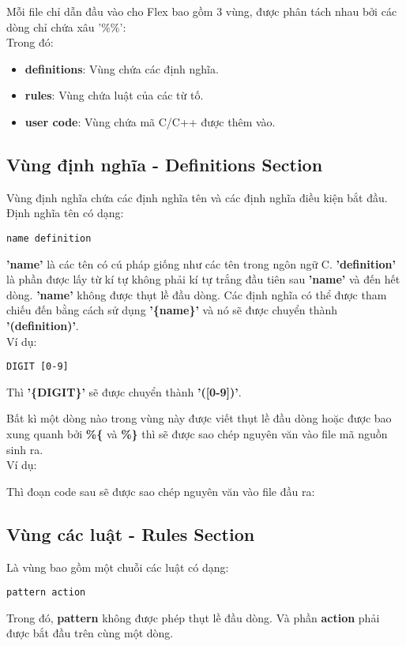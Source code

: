 \documentclass[../report.tex]{subfiles}
\begin{document}
Mỗi file chỉ dẫn đầu vào cho Flex bao gồm 3 vùng, được phân tách nhau 
bởi các dòng chỉ chứa xâu '\%\%': \cite{flex-manual} \\


\noindent Trong đó: 
\begin{itemize}
\item \textbf{definitions}: Vùng chứa các định nghĩa. 
\item \textbf{rules}: Vùng chứa luật của các từ tố. 
\item \textbf{user code}: Vùng chứa mã C/C++ được thêm vào.
\end{itemize}

\subsection{Vùng định nghĩa - Definitions Section}
Vùng định nghĩa chứa các định nghĩa tên và các định nghĩa điều kiện bắt đầu.
Định nghĩa tên có dạng:
\begin{lstlisting}
name definition
\end{lstlisting}
\textbf{'name'} là các tên có cú pháp giống như các tên trong ngôn ngữ C.
\textbf{'definition'} là phần được lấy từ kí tự không phải kí tự trắng đầu tiên 
sau \textbf{'name'} và đến hết dòng. 
\textbf{'name'} không được thụt lề đầu dòng. 
Các định nghĩa có thể được tham chiếu đến bằng cách sử dụng \textbf{'\{name\}'} 
và nó sẽ được chuyển thành \textbf{'(definition)'}. \\
Ví dụ: 
\begin{lstlisting}
DIGIT [0-9]
\end{lstlisting}
Thì \textbf{'\{DIGIT\}'} sẽ được chuyển thành \textbf{'([0-9])'}.

Bất kì một dòng nào trong vùng này được viết thụt lề đầu dòng hoặc 
được bao xung quanh bởi \textbf{\%\{} và \textbf{\%\}} thì sẽ được sao chép nguyên văn 
vào file mã nguồn sinh ra. \\
Ví dụ: 

Thì đoạn code sau sẽ được sao chép nguyên văn vào file đầu ra: 


\subsection{Vùng các luật - Rules Section}
Là vùng bao gồm một chuỗi các luật có dạng:
\begin{lstlisting}
pattern action
\end{lstlisting}
Trong đó, \textbf{pattern} không được phép thụt lề đầu dòng. 
Và phần \textbf{action} phải được bắt đầu trên cùng một dòng. 
\end{document}
